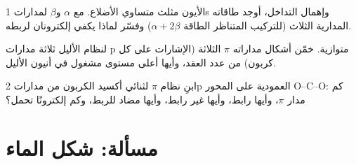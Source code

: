 \begin{exercise}[$\star\star\star$]\label{exo:b2:fragment-orbitals:10}
الأيون  مثلث متساوي الأضلاع. مع $\alpha$ و$\beta$ لمدارات 1s
وإهمال التداخل، أوجد طاقاته المدارية الثلاث (للتركيب المتناظر
الطاقة $\alpha + 2\beta$) وفسّر لماذا يكفي إلكترونان
لربطه.
\end{exercise}

\begin{exercise}[$\star\star\star$]\label{exo:b2:fragment-orbitals:11}
لنظام الأليل  ثلاثة مدارات p متوازية. خمّن أشكال
مداراته $\pi$ الثلاثة (الإشارات على كل كربون) من عدد العقد، وأيها
أعلى مستوى مشغول في أنيون الأليل.
\end{exercise}

\begin{exercise}[$\star\star\star$]\label{exo:b2:fragment-orbitals:12}
ابنِ نظام $\pi$ لثنائي أكسيد الكربون من مدارات 2p العمودية على
المحور O--C--O: كم مدار $\pi$، وأيها رابط، وأيها غير رابط، وأيها
مضاد للربط، وكم إلكترونًا تحمل؟
\end{exercise}

\section{مسألة: شكل الماء}

